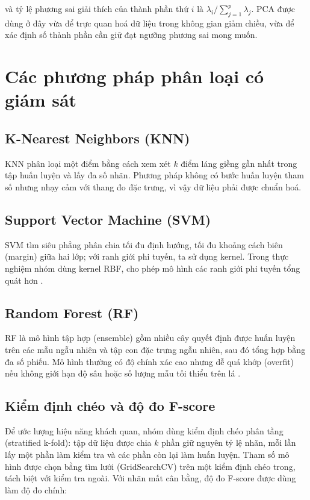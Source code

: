 và tỷ lệ phương sai giải thích của thành phần thứ $i$ là
$\lambda_i / \sum_{j=1}^{p}\lambda_j$. PCA được dùng ở đây vừa để trực quan hoá dữ liệu trong
không gian giảm chiều, vừa để xác định số thành phần cần giữ đạt ngưỡng phương sai mong muốn.

\section{Các phương pháp phân loại có giám sát}

\subsection{K-Nearest Neighbors (KNN)}
KNN phân loại một điểm bằng cách xem xét $k$ điểm láng giềng gần nhất trong tập huấn luyện
và lấy đa số nhãn. Phương pháp không có bước huấn luyện tham số nhưng nhạy cảm với thang đo
đặc trưng, vì vậy dữ liệu phải được chuẩn hoá.

\subsection{Support Vector Machine (SVM)}
SVM tìm siêu phẳng phân chia tối đu định hướng, tối đu khoảng cách biên (margin) giữa hai lớp;
với ranh giới phi tuyến, ta sử dụng kernel. Trong thực nghiệm nhóm dùng kernel RBF, cho phép
mô hình các ranh giới phi tuyến tổng quát hơn \cite{han2011,james2013}.

\subsection{Random Forest (RF)}
RF là mô hình tập hợp (ensemble) gồm nhiều cây quyết định được huấn luyện trên các mẫu ngẫu
nhiên và tập con đặc trưng ngẫu nhiên, sau đó tổng hợp bằng đa số phiếu. Mô hình thường có
độ chính xác cao nhưng dễ quá khớp (overfit) nếu không giới hạn độ sâu hoặc số lượng mẫu tối
thiểu trên lá \cite{james2013}.

\subsection{Kiểm định chéo và độ đo F-score}
Để ước lượng hiệu năng khách quan, nhóm dùng kiểm định chéo phân tầng (stratified k-fold): tập
dữ liệu được chia $k$ phần giữ nguyên tỷ lệ nhãn, mỗi lần lấy một phần làm kiểm tra và các
phần còn lại làm huấn luyện. Tham số mô hình được chọn bằng tìm lưới (GridSearchCV) trên một
kiểm định chéo trong, tách biệt với kiểm tra ngoài. Với nhãn mất cân bằng, độ đo F-score được
dùng làm độ đo chính:

